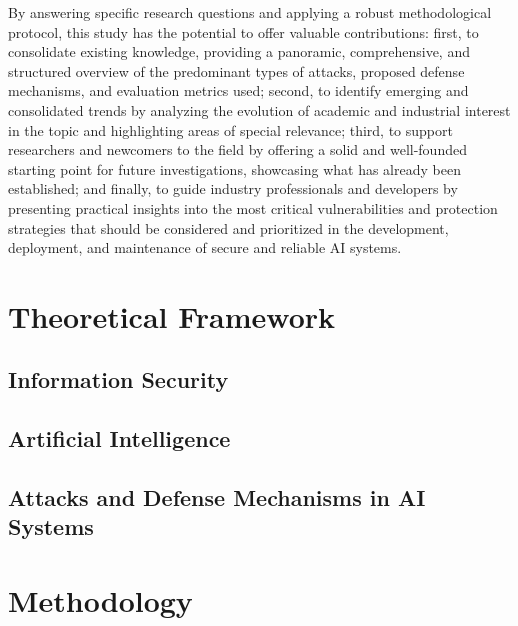 \documentclass[twoside,brazilian,english]{UNISINOSmonografia}
\begin{document}
By answering specific research questions and applying a robust methodological protocol, this study has the potential to offer valuable contributions: first, to consolidate existing knowledge, providing a panoramic, comprehensive, and structured overview of the predominant types of attacks, proposed defense mechanisms, and evaluation metrics used; second, to identify emerging and consolidated trends by analyzing the evolution of academic and industrial interest in the topic and highlighting areas of special relevance; third, to support researchers and newcomers to the field by offering a solid and well-founded starting point for future investigations, showcasing what has already been established; and finally, to guide industry professionals and developers by presenting practical insights into the most critical vulnerabilities and protection strategies that should be considered and prioritized in the development, deployment, and maintenance of secure and reliable AI systems.


\chapter{Theoretical Framework}

\section{Information Security}

\section{Artificial Intelligence}

\section{Attacks and Defense Mechanisms in AI Systems}



\chapter{Methodology}
\end{document}
